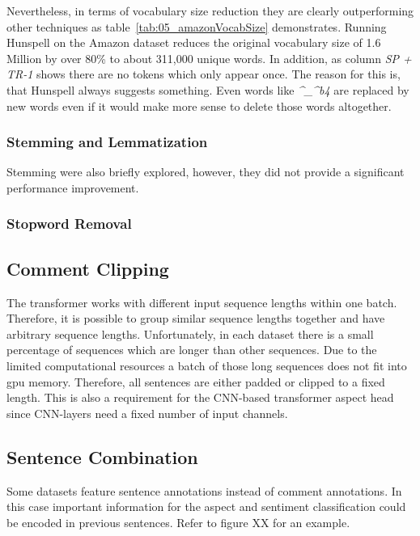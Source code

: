 Nevertheless, in terms of vocabulary size reduction they are clearly outperforming other techniques as table~\ref{tab:05_amazonVocabSize} demonstrates. Running Hunspell on the Amazon dataset reduces the original vocabulary size of 1.6 Million by over 80\% to about 311,000 unique words. In addition, as column \textit{SP + TR-1} shows there are no tokens which only appear once. The reason for this is, that Hunspell always suggests something. Even words like \textit{\^{}\_\^{}b4} are replaced by new words even if it would make more sense to delete those words altogether.


\subsubsection*{Stemming and Lemmatization}

Stemming were also briefly explored, however, they did not provide a significant performance improvement.

\subsubsection*{Stopword Removal}


\subsection{Comment Clipping}
\label{subsec:06_CommentClipping}


The transformer works with different input sequence lengths within one batch. Therefore, it is possible to group similar sequence lengths together and have arbitrary sequence lengths. Unfortunately, in each dataset there is a small percentage of sequences which are longer than other sequences. Due to the limited computational resources a batch of those long sequences  does not fit into \gls{gpu} memory. Therefore, all sentences are either padded or clipped to a fixed length. This is also a requirement for the CNN-based transformer aspect head since CNN-layers need a fixed number of input channels.

\subsection{Sentence Combination}
\label{sec:05_sentenceCombination}
Some datasets feature sentence annotations instead of comment annotations. In this case important information for the aspect and sentiment classification could be encoded in previous sentences. Refer to figure XX for an example.
\medskip

